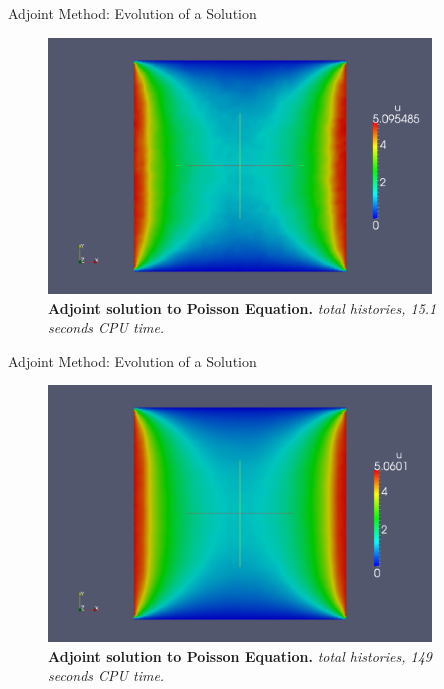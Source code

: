 \documentclass{beamer}
\begin{document}
\begin{frame}{Adjoint Method: Evolution of a Solution}

  \begin{figure}[h!]
    \begin{center}
      \includegraphics[width=4in]{../../prelim/presentation/adjoint_1000000.png}
    \end{center}
    \caption{\textbf{Adjoint solution to Poisson Equation.}
      \textit{ total histories, 15.1 seconds CPU time.} }
  \end{figure}

\end{frame}

\begin{frame}{Adjoint Method: Evolution of a Solution}

  \begin{figure}[h!]
    \begin{center}
      \includegraphics[width=4in]{../../prelim/presentation/adjoint_10000000.png}
    \end{center}
    \caption{\textbf{Adjoint solution to Poisson Equation.}
      \textit{ total histories, 149 seconds CPU time.} }
  \end{figure}

\end{frame}
\end{document}
